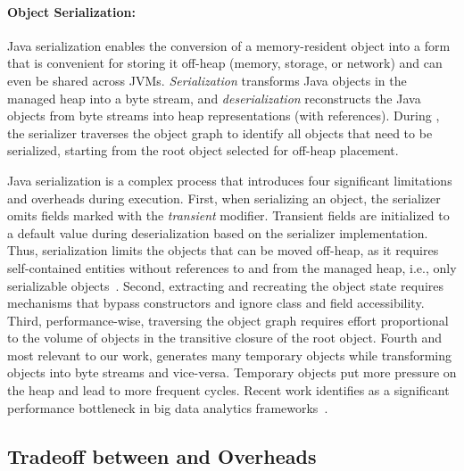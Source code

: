 \paragraph{\textbf{Object Serialization:}}
Java serialization enables the conversion of a memory-resident object into a form that is convenient for storing it off-heap (memory, storage, or network) and can even be shared across JVMs.
\emph{Serialization} transforms Java objects in the managed heap into a byte stream, and \emph{deserialization} reconstructs the Java objects from byte streams into heap representations (with references).
During \teraheapSD, the serializer traverses the object graph to identify all objects that need to be serialized, starting from the root object selected for off-heap placement.

Java serialization is a complex process that introduces four significant limitations and overheads during execution.
First, when serializing an object, the serializer omits fields marked with the \emph{transient} modifier.
Transient fields are initialized to a default value during deserialization based on the serializer implementation.
Thus, serialization limits the objects that can be moved off-heap, as it requires self-contained entities without references to and from the managed heap, i.e., only serializable objects~\cite{grochowski2019serialization, niemeyer2005learning, harold2006java}.
Second, extracting and recreating the object state requires mechanisms that bypass constructors and ignore class and field accessibility.
Third, performance-wise, traversing the object graph requires effort proportional to the volume of objects in the transitive closure of the root object.
Fourth and most relevant to our work, \teraheapSD generates many temporary objects while transforming objects into byte streams and vice-versa.
Temporary objects put more pressure on the heap and lead to more frequent \teraheapGC cycles.
Recent work identifies \teraheapSD as a significant performance bottleneck in big data analytics frameworks~\cite{navasca:gerenuk, nguyen:skyway, matei:champions, taranov:naos}.

\subsection{Tradeoff between \teraheapSD and \teraheapGC Overheads}

